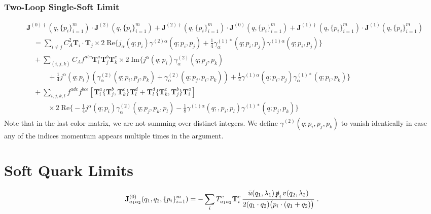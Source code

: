 \documentclass[a4paper,11pt]{article}
\begin{document}
\subsubsection{Two-Loop Single-Soft Limit}
\begin{equation}
\begin{split}
&\mathbf{J}^{(0)\dagger}(q, \lbrace p_i \rbrace_{i = 1}^m) \cdot \mathbf{J}^{(2)}(q, \lbrace p_i \rbrace_{i = 1}^m) + \mathbf{J}^{(2)\dagger}(q, \lbrace p_i \rbrace_{i = 1}^m) \cdot \mathbf{J}^{(0)}(q, \lbrace p_i \rbrace_{i = 1}^m) + \mathbf{J}^{(1)\dagger}(q, \lbrace p_i \rbrace_{i = 1}^m) \cdot \mathbf{J}^{(1)}(q, \lbrace p_i \rbrace_{i = 1}^m) \\
&\quad =   \sum_{i \neq j} C_A^2 \mathbf{T}_i \cdot \mathbf{T}_j \times 2 \; \text{Re}\bigg \lbrace j_\alpha (q; p_i) \gamma^{(2)\alpha}(q; p_i, p_j) + \frac{1}{4} \gamma_\alpha^{(1)*}(q; p_i, p_j) \gamma^{(1)\alpha}(q; p_i, p_j) \bigg \rbrace\\
& \quad + \sum_{(i,j,k)} C_A f^{abc} \mathbf{T}^a_i \mathbf{T}^b_j \mathbf{T}^c_k \times 2\; \text{Im} \bigg \lbrace j^\alpha(q; p_i) \gamma^{(2)}_\alpha(q; p_j, p_k) \\
& \qquad \quad + \frac{1}{4} j^\alpha(q; p_i) \left(\gamma^{(2)}_\alpha(q; p_i, p_j, p_k) + \gamma^{(2)}_\alpha(q; p_j, p_i, p_k) \right)  + \frac{1}{2} \gamma^{(1)\alpha}(q; p_i, p_j) \gamma^{(1)*}_\alpha (q; p_i, p_k) \bigg \rbrace\\
& \quad + \sum_{i, j, k, l} f^{a d e} f^{bce} \left[ \mathbf{T}_i^a \big \lbrace \mathbf{T}_j^b, \mathbf{T}_k^c \big \rbrace \mathbf{T}_l^d + \mathbf{T}_l^d \big \lbrace \mathbf{T}_k^c, \mathbf{T}_j^b \big \rbrace \mathbf{T}_i^a \right] \\
& \qquad \quad \times 2\; \text{Re} \bigg \lbrace - \frac{1}{4}  j^\alpha(q; p_i) \gamma^{(2)}_\alpha(q; p_j, p_k, p_l) - \frac{1}{8} \gamma^{(1)\alpha}(q;, p_i, p_l) \gamma^{(1)*}(q; p_j, p_k) \bigg \rbrace
\end{split}
\label{eq:two_loop_squared}
\end{equation}
Note that in the last color matrix, we are not summing over distinct integers. We define $\gamma^{(2)}(q; p_i, p_j, p_k)$ to vanish identically in case any of the indices momentum appears multiple times in the argument.

\section{Soft Quark Limits}
\begin{equation} \label{eq:J0quarks}
    \mathbf{J}^{(0)}_{a_1 a_2}(q_1, q_2, \{ p_i \}_{i=1}^m ) = - \sum_{i} T^c_{a_1a_2} \mathbf{T}^c_i \, \frac{\bar{u}(q_1,\lambda_1) \, \slashed{p}_i \, v(q_2,\lambda_2)}{2 ( q_1 \cdot q_2 ) \big( p_i \cdot (q_1  + q_2) \big)} \; .
\end{equation}
\end{document}
